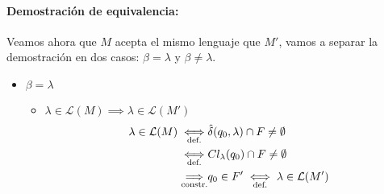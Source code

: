 \paragraph{Demostración de equivalencia:} Veamos ahora que \(M\) acepta el mismo lenguaje que \(M'\), vamos a separar la demostración en dos casos: \(\beta=\lambda\) y \(\beta \neq \lambda\).
\begin{itemize}
  \item \(\beta=\lambda\)
        \begin{itemize}
          \item \(\lambda\in\mathcal{L}(M) \implies \lambda\in\mathcal{L}(M')\)
                \begin{align*}
                  \lambda\in \mathcal{L}( M)  \underset{\text{def.}}{\iff} & \hat\delta(q_0,\lambda)\cap F \neq \emptyset     \\ \underset{\text{def.}}{\iff} &Cl_{\lambda}(q_0)\cap F \neq \emptyset \\
                  \underset{\text{constr.}}{\implies}                         & q_0\in F' \underset{\text{def.}}{\iff} \lambda\in \mathcal{L}(M')
                \end{align*}


\end{itemize}
\end{itemize}
